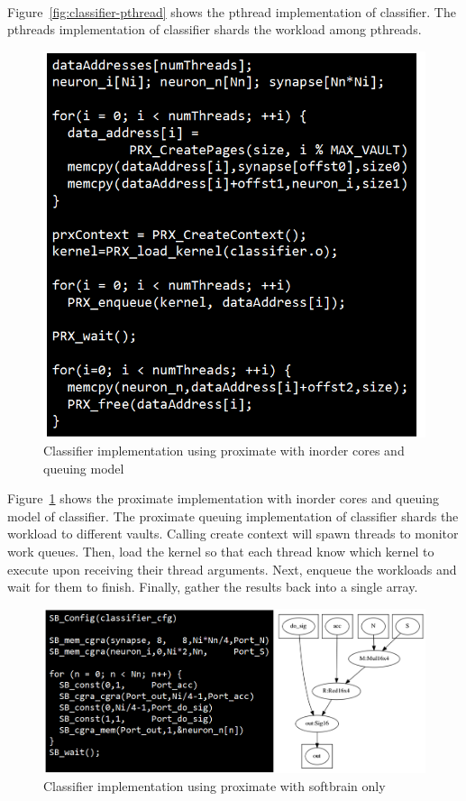 \paragraph{}

Figure~\ref{fig:classifier-pthread} shows the pthread implementation of 
classifier. The pthreads implementation of classifier shards the 
workload among pthreads. 


\begin{figure}
  \begin{center}
    \includegraphics[width=0.5\linewidth]{cs758-figs/classifier-prx_inorder_q.png}
  \end{center}
\vspace{-0.2in}
  \caption{Classifier implementation using proximate with inorder cores and queuing model}
  \label{fig:classifier-prx_inorder_q}
\vspace{-0.05in}
\end{figure}

Figure~\ref{fig:classifier-prx_inorder_q} shows the proximate implementation 
with inorder cores and queuing model of classifier. The proximate queuing 
implementation of classifier shards the 
workload to different vaults. Calling create context 
will spawn threads to monitor work queues. Then, load the kernel so that each thread
know which kernel to execute upon receiving their thread arguments. 
Next, enqueue the workloads and wait for them to finish. 
Finally, gather the results back into a single array. 


\begin{figure}
  \begin{center}
    \includegraphics[width=\linewidth]{cs758-figs/classifier-prx_sb_only.png}
  \end{center}
\vspace{-0.2in}
  \caption{Classifier implementation using proximate with softbrain only}
  \label{fig:classifier-prx_sb_only}
\vspace{-0.05in}
\end{figure}


